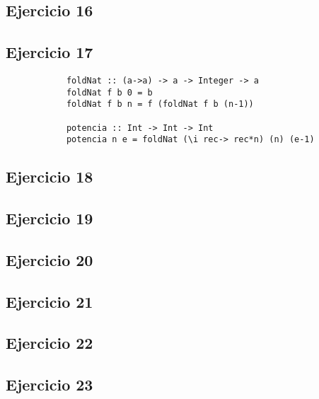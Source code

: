 \subsection{Ejercicio 16}
\subsection{Ejercicio 17}

	\begin{centrado}
		\begin{verbatim}
			foldNat :: (a->a) -> a -> Integer -> a
			foldNat f b 0 = b
			foldNat f b n = f (foldNat f b (n-1))
			
			potencia :: Int -> Int -> Int
			potencia n e = foldNat (\i rec-> rec*n) (n) (e-1)
		\end{verbatim}
	\end{centrado}
\subsection{Ejercicio 18}
\subsection{Ejercicio 19}
\subsection{Ejercicio 20}
\subsection{Ejercicio 21}
\subsection{Ejercicio 22}
\subsection{Ejercicio 23}
